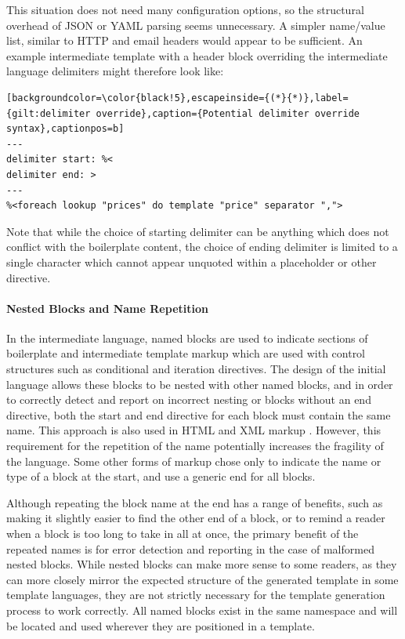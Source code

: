 This situation does not need many configuration options, so the structural overhead of JSON or YAML parsing seems unnecessary. A simpler name/value list, similar to HTTP and email headers would appear to be sufficient. An example intermediate template with a header block overriding the intermediate language delimiters might therefore look like:

\begin{lstlisting}[backgroundcolor=\color{black!5},escapeinside={(*}{*)},label={gilt:delimiter override},caption={Potential delimiter override syntax},captionpos=b]
---
delimiter start: %<
delimiter end: >
---
%<foreach lookup "prices" do template "price" separator ",">
\end{lstlisting}

Note that while the choice of starting delimiter can be anything which does not conflict with the boilerplate content, the choice of ending delimiter is limited to a single character which cannot appear unquoted within a placeholder or other directive.

\paragraph{Nested Blocks and Name Repetition}

In the intermediate language, named blocks are used to indicate sections of boilerplate and intermediate template markup which are used with control structures such as conditional and iteration directives. The design of the initial language allows these blocks to be nested with other named blocks, and in order to correctly detect and report on incorrect nesting or blocks without an end directive, both the start and end directive for each block must contain the same name. This approach is also used in HTML and XML markup \citep{Bray2008}. However, this requirement for the repetition of the name potentially increases the fragility of the language. Some other forms of markup chose only to indicate the name or type of a block at the start, and use a generic end for all blocks.

Although repeating the block name at the end has a range of benefits, such as making it slightly easier to find the other end of a block, or to remind a reader when a block is too long to take in all at once, the primary benefit of the repeated names is for error detection and reporting in the case of malformed nested blocks. While nested blocks can make more sense to some readers, as they can more closely mirror the expected structure of the generated template in some template languages, they are not strictly necessary for the template generation process to work correctly. All named blocks exist in the same namespace and will be located and used wherever they are positioned in a template.

